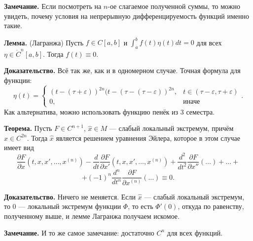 \textbf{Замечание.} Если посмотреть на $n$-ое слагаемое полученной суммы, то можно увидеть, почему условия на непрерывную дифференцируемость функций именно такие.

\textbf{Лемма.} (Лагранжа) Пусть $f \in C[a, b]$ и $\int_a^b f(t) \eta(t) dt = 0$ для всех $\eta \in \mathring C^n[a, b]$.
Тогда $f(t) \equiv 0$.

\textbf{Доказательство.} Всё так же, как и в одномерном случае.
Точная формула для функции:
\[
    \eta(t) =
    \begin{cases}
        (t - (\tau + \varepsilon))^{2n} (t - (\tau - (\tau - \varepsilon))^{2n}, & t \in (\tau - \varepsilon, \tau + \varepsilon) \\
        0, & \text{иначе}
    \end{cases} .
\]
Как альтернатива, можно использовать функцию пенёк из 3 семестра.

\QED

\textbf{Теорема.} Пусть $F \in C^{n+1}$, $\widehat x \in M$ --- слабый локальный экстремум, причём $\widehat x \in C^{2n}$.
Тогда $\widehat x$ является решением уравнения Эйлера, которое в этом случае имеет вид
\[
    \frac{\partial F}{\partial x}(t, x, x', \dots, x^{(n)}) - \frac{d}{dt} \frac{\partial F}{\partial x'} (t, x, x', \dots, x^{(n)}) + \frac{d^2}{dt^2} \frac{\partial F}{\partial x''}(\dots) + \dots +
\]
\[
    + (-1)^n \frac{d^n}{dt^n} \frac{\partial F}{\partial x^{(n)}}(\dots) \equiv 0.
\]

\textbf{Доказательство.} Ничего не меняется. Если $\widehat x$ --- слабый локальный экстремум, то $0$ --- локальный экстремум функции $\Phi$, то есть $\Phi'(0)$, откуда по равенству, полученному выше, и лемме Лагранжа получаем искомое.

\QED

\textbf{Замечание.} И то же самое замечание: достаточно $C^n$ для всех функций.




